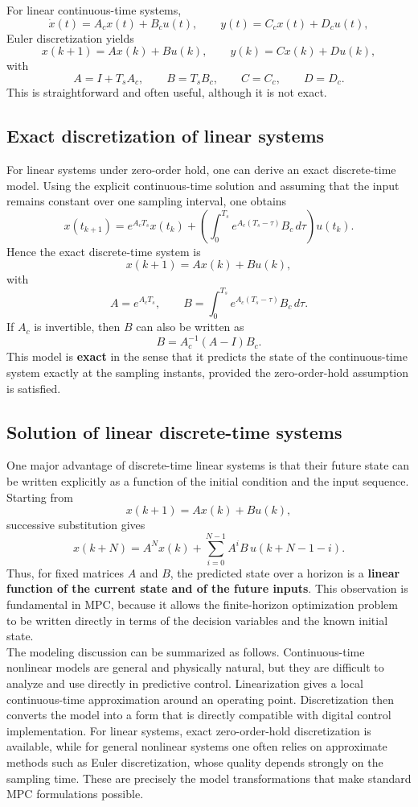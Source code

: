 For linear continuous-time systems,
\[
\dot{x}(t)=A_c x(t)+B_c u(t), \qquad y(t)=C_c x(t)+D_c u(t),
\]
Euler discretization yields
\[
x(k+1)=Ax(k)+Bu(k), \qquad y(k)=Cx(k)+Du(k),
\]
with
\[
A = I + T_s A_c, \qquad B = T_s B_c, \qquad C=C_c, \qquad D=D_c.
\]
This is straightforward and often useful, although it is not exact.

\subsection{Exact discretization of linear systems}

For linear systems under zero-order hold, one can derive an exact discrete-time model. Using the explicit continuous-time solution and assuming that the input remains constant over one sampling interval, one obtains
\[
x(t_{k+1}) = e^{A_c T_s}x(t_k) + \left(\int_{0}^{T_s} e^{A_c(T_s-\tau)}B_c\,d\tau\right) u(t_k).
\]
Hence the exact discrete-time system is
\[
x(k+1)=Ax(k)+Bu(k),
\]
with
\[
A = e^{A_cT_s},
\qquad
B = \int_0^{T_s} e^{A_c(T_s-\tau)}B_c\,d\tau.
\]
If $A_c$ is invertible, then $B$ can also be written as
\[
B = A_c^{-1}(A-I)B_c.
\]
This model is \textbf{exact} in the sense that it predicts the state of the continuous-time system exactly at the sampling instants, provided the zero-order-hold assumption is satisfied.

\subsection{Solution of linear discrete-time systems}

One major advantage of discrete-time linear systems is that their future state can be written explicitly as a function of the initial condition and the input sequence. Starting from
\[
x(k+1)=Ax(k)+Bu(k),
\]
successive substitution gives
\[
x(k+N)=A^N x(k) + \sum_{i=0}^{N-1} A^i B\,u(k+N-1-i).
\]
Thus, for fixed matrices $A$ and $B$, the predicted state over a horizon is a \textbf{linear function of the current state and of the future inputs}. This observation is fundamental in MPC, because it allows the finite-horizon optimization problem to be written directly in terms of the decision variables and the known initial state.\\

The modeling discussion can be summarized as follows. Continuous-time nonlinear models are general and physically natural, but they are difficult to analyze and use directly in predictive control. Linearization gives a local continuous-time approximation around an operating point. Discretization then converts the model into a form that is directly compatible with digital control implementation. For linear systems, exact zero-order-hold discretization is available, while for general nonlinear systems one often relies on approximate methods such as Euler discretization, whose quality depends strongly on the sampling time. These are precisely the model transformations that make standard MPC formulations possible.

